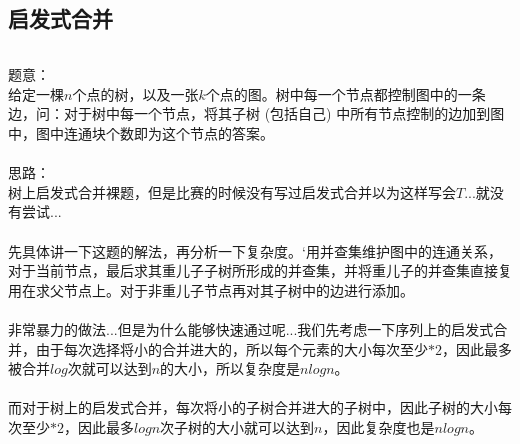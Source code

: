 \documentclass[twoside]{article}
\begin{document}
\subsection{启发式合并}
\begin{lstlisting}
\end{lstlisting}
题意：\\
给定一棵$n$个点的树，以及一张$k$个点的图。树中每一个节点都控制图中的一条边，问：对于树中每一个节点，将其子树 (包括自己) 中所有节点控制的边加到图中，图中连通块个数即为这个节点的答案。\\
\\
思路：\\
树上启发式合并裸题，但是比赛的时候没有写过启发式合并以为这样写会$T$...就没有尝试...\\
\\
先具体讲一下这题的解法，再分析一下复杂度。`用并查集维护图中的连通关系，对于当前节点，最后求其重儿子子树所形成的并查集，并将重儿子的并查集直接复用在求父节点上。对于非重儿子节点再对其子树中的边进行添加。\\
\\
非常暴力的做法...但是为什么能够快速通过呢...我们先考虑一下序列上的启发式合并，由于每次选择将小的合并进大的，所以每个元素的大小每次至少$*2$，因此最多被合并$log$次就可以达到$n$的大小，所以复杂度是$nlogn$。\\
\\
而对于树上的启发式合并，每次将小的子树合并进大的子树中，因此子树的大小每次至少$*2$，因此最多$logn$次子树的大小就可以达到$n$，因此复杂度也是$nlogn$。\\
\end{document}
